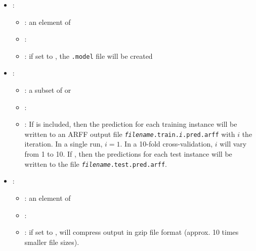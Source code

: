 \begin{itemize}
{           \begin{itemize}
                \item \optionPossibleValues{}: ???
                \item \optionDefaultValue{}: 
                \item \optionDescrption{}: ???
           \end{itemize}
    }
    \item {}:
           \begin{itemize}
                \item \optionPossibleValues{}: an element of 
                \item \optionDefaultValue{}: 
                \item \optionDescrption{}: if set to , the \texttt{.model} file will be created
           \end{itemize}
    \item {}:
           \begin{itemize}
                \item \optionPossibleValues{}: a subset of  or 
                \item \optionDefaultValue{}: 
                \item \optionDescrption{}: If  is included, then the prediction for each training instance will be written to an ARFF output file {\tt {\em filename}.train.{\em i}.pred.arff} with $i$ the iteration. In a single run, $i = 1$. In a 10-fold cross-validation, $i$ will vary from 1 to 10. If , then the predictions for each test instance will be written to the file
                {\tt {\em filename}.test.pred.arff}.
           \end{itemize}
    \item {}:
           \begin{itemize}
                \item \optionPossibleValues{}: an element of 
                \item \optionDefaultValue{}: 
                \item \optionDescrption{}:  if set to , \clus{} will compress output in gzip file format (approx. 10 times smaller file sizes).

\end{itemize}
\end{itemize}
